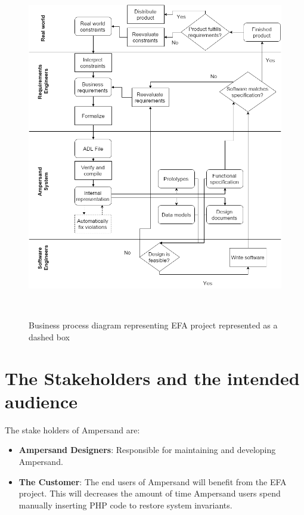 \begin{figure}[!htb]
\begin{center}
\includegraphics[width=\textwidth]{../figures/business_process}
\caption{Business process diagram representing EFA project represented as a dashed box}~\label{fig:EFAproject}
\end{center}
\end{figure}

 \section{The Stakeholders and the intended audience}\label{sec:Stakeholders}
The stake holders of Ampersand are:

\begin{itemize}
	\item \textbf{Ampersand Designers}: Responsible for maintaining and developing Ampersand.
	\item \textbf{The Customer}: The end users of Ampersand will benefit from the EFA project. This will decreases the amount of time 
Ampersand users spend manually inserting PHP code to restore system invariants. 
\end{itemize}

